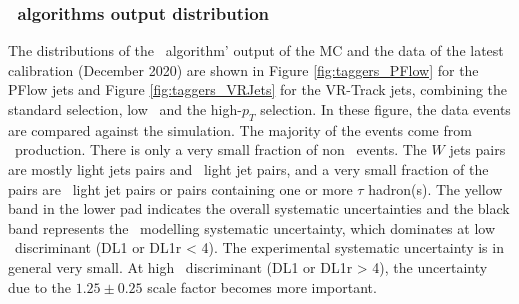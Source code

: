 \documentclass[letterpaper,12pt]{article}
\begin{document}
\subsubsection{\btagging\ algorithms output distribution}
The distributions of the \btagging\ algorithm' output of 
the MC and the data of the latest calibration 
(December 2020) are shown in Figure \ref{fig:taggers_PFlow} for the PFlow jets and 
Figure \ref{fig:taggers_VRJets} for the VR-Track jets, 
combining the standard selection, low \pt\ and the high-$p_T$ selection. 
In these figure, the data events are compared against the simulation.
The majority of the events come from \ttbar\ production. There is only
a very small fraction of non \ttbar\ events. The $W$ jets pairs are mostly light jets 
pairs and \cjet\ light jet pairs, and a very small fraction of the pairs are 
\bjet\ light jet pairs or pairs containing one or more $\tau$ hadron(s). 
The yellow band in the lower pad indicates the overall systematic uncertainties
and the black band represents the \ttbar\ modelling systematic uncertainty, 
which dominates at low \btagging\ discriminant (DL1 or DL1r < 4). 
The experimental systematic uncertainty is in general very small. 
At high \btagging\ discriminant (DL1 or DL1r > 4), the
uncertainty due to the $1.25 \pm 0.25$ scale factor 
becomes more important. 
\end{document}

